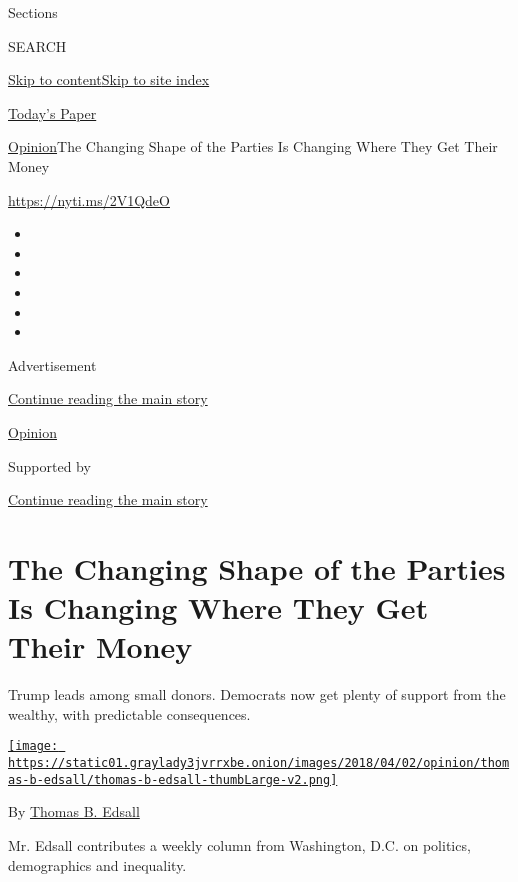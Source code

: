 Sections

SEARCH

\protect\hyperlink{site-content}{Skip to
content}\protect\hyperlink{site-index}{Skip to site index}

\href{https://myaccount.nytimes3xbfgragh.onion/auth/login?response_type=cookie\&client_id=vi}{}

\href{https://www.nytimes3xbfgragh.onion/section/todayspaper}{Today's
Paper}

\href{/section/opinion}{Opinion}\textbar{}The Changing Shape of the
Parties Is Changing Where They Get Their Money

\url{https://nyti.ms/2V1QdeO}

\begin{itemize}
\item
\item
\item
\item
\item
\item
\end{itemize}

Advertisement

\protect\hyperlink{after-top}{Continue reading the main story}

\href{/section/opinion}{Opinion}

Supported by

\protect\hyperlink{after-sponsor}{Continue reading the main story}

\hypertarget{the-changing-shape-of-the-parties-is-changing-where-they-get-their-money}{%
\section{The Changing Shape of the Parties Is Changing Where They Get
Their
Money}\label{the-changing-shape-of-the-parties-is-changing-where-they-get-their-money}}

Trump leads among small donors. Democrats now get plenty of support from
the wealthy, with predictable consequences.

\href{https://www.nytimes3xbfgragh.onion/by/thomas-b-edsall}{\texttt{[image: https://static01.graylady3jvrrxbe.onion/images/2018/04/02/opinion/thomas-b-edsall/thomas-b-edsall-thumbLarge-v2.png]}}

By \href{https://www.nytimes3xbfgragh.onion/by/thomas-b-edsall}{Thomas
B. Edsall}

Mr. Edsall contributes a weekly column from Washington, D.C. on
politics, demographics and inequality.

